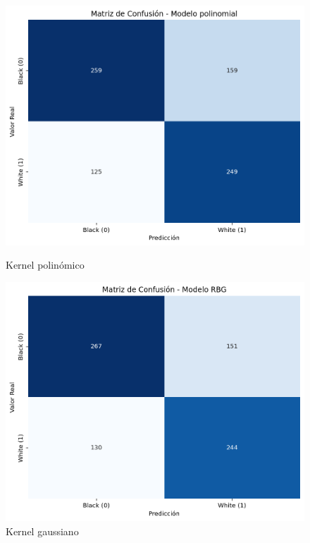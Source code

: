 \documentclass[a4paper,onecolumn]{extarticle}
\begin{document}
\begin{sloppypar}
\begin{figure}[h!]
\begin{minipage}[b]{0.3\textwidth}
        \centering
        \includegraphics[width=\textwidth]{imgs/confPol.png}
        \caption{Kernel polinómico}
    \end{minipage}%
    \hspace{1em}  %
    \begin{minipage}[b]{0.3\textwidth}
        \centering
        \includegraphics[width=\textwidth]{imgs/confGaus.png}
        \caption{Kernel gaussiano}
    \end{minipage}
    \label{fig:confusiones}
\end{figure}


\end{sloppypar}
\end{document}
